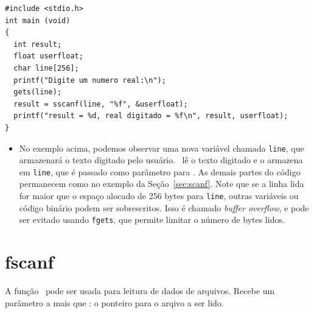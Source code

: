 \begin{lstlisting}
#include <stdio.h> 
int main (void)
{
  int result;
  float userfloat;
  char line[256];
  printf("Digite um numero real:\n");
  gets(line);
  result = sscanf(line, "%f", &userfloat);
  printf("result = %d, real digitado = %f\n", result, userfloat);
}
\end{lstlisting}

\begin{itemize}

\item No exemplo acima, podemos observar uma nova variável chamada {\tt line}, que armazenará o texto digitado pelo usuário. \GETS\ lê o texto digitado e o armazena em {\tt line}, que é passado como parâmetro para \SSCANF. As demais partes do código permanecem como no exemplo da Seção~\ref{sec:scanf}. Note que se a linha lida for maior que o espaço alocado de 256 bytes para {\tt line}, outras variáveis ou código binário podem ser sobrescritos. Isso é chamado \textit{buffer overflow}, e pode ser evitado usando {\tt fgets}, que permite limitar o número de bytes lidos.

\end{itemize}


\section{fscanf}
\label{sec:fscanf}

A função \FSCANF\ pode ser usada para leitura de dados de arquivos. Recebe um parâmetro a mais que \SCANF: o ponteiro para o arqivo a ser lido.

